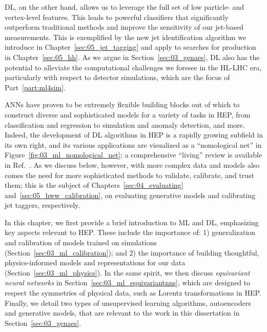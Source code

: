 DL, on the other hand, allows us to leverage the full set of low particle- and vertex-level features.
This leads to powerful classifiers that significantly outperform traditional methods and improve the sensitivity of our jet-based measurements.
This is exemplified by the new \HVV jet identification algorithm we introduce in Chapter~\ref{sec:05_jet_tagging} and apply to searches for \HH production in Chapter~\ref{sec:05_hh}.
As we argue in Section~\ref{sec:03_genaes}, DL also has the potential to alleviate the computational challenges we foresee in the HL-LHC era, particularly with respect to detector simulations, which are the focus of Part~\ref{part:ml4sim}.

ANNs have proven to be extremely flexible building blocks out of which to construct diverse and sophisticated models for a variety of tasks in HEP, from classification and regression to simulation and anomaly detection, and more.
Indeed, the development of DL algorithms in HEP is a rapidly growing subfield in its own right, and its various applications are visualized as a ``nomological net'' in Figure~\ref{fig:03_ml_nomological_net}; a comprehensive ``living'' review is available in Ref.~\cite{hepmllivingreview}.
As we discuss below, however, with more complex data and models also comes the need for more sophisticated methods to validate, calibrate, and trust them; this is the subject of Chapters~\ref{sec:04_evaluating} and~\ref{sec:05_hww_calibration}, on evaluating generative models and calibrating \HVV jet taggers, respectively.

In this chapter, we first provide a brief introduction to ML and DL, emphasizing key aspects relevant to HEP.
These include the importance of: 1) generalization and calibration of models trained on simulations (Section~\ref{sec:03_ml_calibration}); and 2) the importance of building thoughtful, physics-informed models and representations for our data (Section~\ref{sec:03_ml_physics}).
In the same spirit, we then discuss \textit{equivariant neural networks} in Section~\ref{sec:03_ml_equivariantnns}, which are designed to respect the symmetries of physical data, such as Lorentz transformations in HEP.
Finally, we detail two types of unsupervised learning algorithms, autoencoders and generative models, that are relevant to the work in this dissertation in Section~\ref{sec:03_genaes}.

